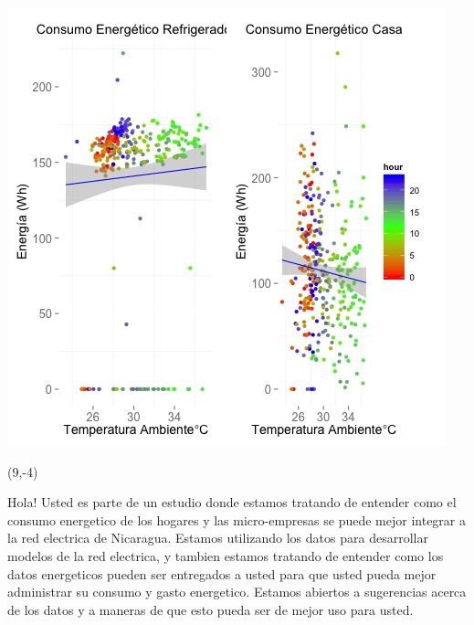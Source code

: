 \documentclass{article}\usepackage[]{graphicx}\usepackage[]{color}
\newenvironment{knitrout}{}{} %
\begin{document}
\begin{knitrout}
\color{fgcolor}
\includegraphics[scale=0.75]{figure/A15_correlaciones} 
\end{knitrout}

 \begin{textblock}{1}(9,-4)
\begin{minipage}{20em}
\begingroup

\endgroup
\end{minipage}
\end{textblock}

\vspace{70px}
\begin{knitrout}
Hola! Usted es parte de un estudio donde estamos tratando de entender como el consumo energetico de los hogares y las micro-empresas se puede mejor integrar a la red electrica de Nicaragua. Estamos utilizando los datos para desarrollar modelos de la red electrica, y tambien estamos tratando de entender como los datos energeticos pueden ser entregados a usted para que usted pueda mejor administrar su consumo y gasto energetico.  Estamos abiertos a sugerencias acerca de los datos y a maneras de que esto pueda ser de mejor uso para usted.
\end{knitrout}
\end{document}
